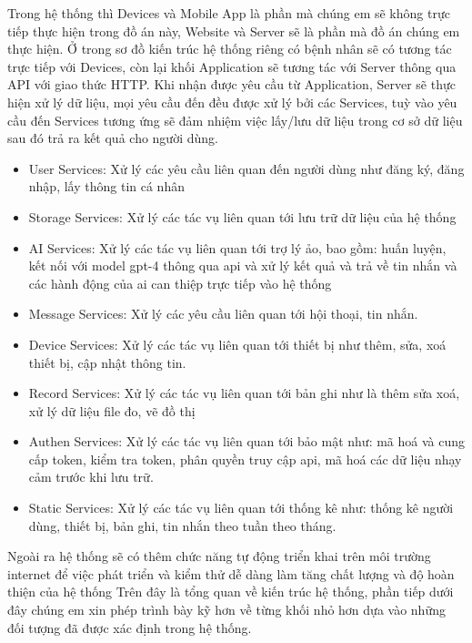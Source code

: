 Trong hệ thống thì Devices và Mobile App là phần mà chúng em sẽ không trực tiếp thực hiện trong đồ án này, Website và Server sẽ là
phần mà đồ án chúng em thực hiện. Ở trong sơ đồ kiến trúc hệ thống riêng có bệnh nhân sẽ có tương tác trực tiếp với Devices,
còn lại khối Application sẽ tương tác với Server thông qua API với giao thức HTTP. Khi nhận được yêu cầu từ Application,
Server sẽ thực hiện xử lý dữ liệu, mọi yêu cầu đến đều được xử lý bởi các Services, tuỳ vào yêu cầu đến Services tương ứng sẽ đảm nhiệm 
việc lấy/lưu dữ liệu trong cơ sở dữ liệu sau đó trả ra kết quả cho người dùng.
\begin{adjustwidth}{1.5em}{}
\begin{itemize}
  \item User Services: Xử lý các yêu cầu liên quan đến người dùng như đăng ký, đăng nhập, lấy thông tin cá nhân
  \item Storage Services: Xử lý các tác vụ liên quan tới lưu trữ dữ liệu của hệ thống
  \item AI Services: Xử lý các tác vụ liên quan tới trợ lý ảo, bao gồm: huấn luyện, kết nối với model gpt-4 thông qua api và xử lý kết quả 
  và trả về tin nhắn và các hành động của ai can thiệp trực tiếp vào hệ thống 
  \item Message Services: Xử lý các yêu cầu liên quan tới hội thoại, tin nhắn.
  \item Device Services: Xử lý các tác vụ liên quan tới thiết bị như thêm, sửa, xoá thiết bị, cập nhật thông tin.
  \item Record Services: Xử lý các tác vụ liên quan tới bản ghi như là thêm sửa xoá, xử lý dữ liệu file đo, vẽ đồ thị
  \item Authen Services: Xử lý các tác vụ liên quan tới bảo mật như: mã hoá và cung cấp token, kiểm tra token, phân quyền truy cập api, mã hoá các dữ liệu nhạy cảm trước khi lưu trữ.
  \item Static Services: Xử lý các tác vụ liên quan tới thống kê như: thống kê người dùng, thiết bị, bản ghi, tin nhắn theo tuần theo tháng.
\end{itemize}
\end{adjustwidth}
Ngoài ra hệ thống sẽ có thêm chức năng tự động triển khai trên môi trường internet để việc phát triển và kiểm thử dễ dàng 
làm tăng chất lượng và độ hoàn thiện của hệ thống
Trên đây là tổng quan về kiến trúc hệ thống, phần tiếp dưới đây chúng em xin phép trình bày kỹ hơn về từng khối nhỏ hơn
dựa vào những đối tượng đã được xác định trong hệ thống.

\newpage
